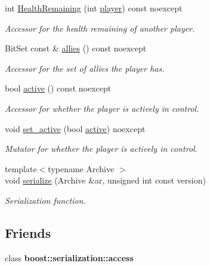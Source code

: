\begin{DoxyCompactItemize}
int \hyperlink{classroundinfo_1_1_round_info_view_a5b7dd1135b438e04017ad0a3bcc4034a}{Health\+Remaining} (int \hyperlink{classroundinfo_1_1_round_info_view_acb1e4edcbe9b01f59ba26542f528ba24}{player}) const noexcept
\begin{DoxyCompactList}\small\item\em Accessor for the health remaining of another player. \end{DoxyCompactList}\item 
Bit\+Set const  \& \hyperlink{classroundinfo_1_1_round_info_view_af00b23d7a3f2fa21fd3cbba1f71e0fd4}{allies} () const noexcept
\begin{DoxyCompactList}\small\item\em Accessor for the set of allies the player has. \end{DoxyCompactList}\item 
bool \hyperlink{classroundinfo_1_1_round_info_view_a1ff1802f7ab8e24008f02bbc0169a160}{active} () const noexcept
\begin{DoxyCompactList}\small\item\em Accessor for whether the player is actively in control. \end{DoxyCompactList}\item 
void \hyperlink{classroundinfo_1_1_round_info_view_a5225bbd75931d1f5235e83d13b726927}{set\+\_\+active} (bool \hyperlink{classroundinfo_1_1_round_info_view_a1ff1802f7ab8e24008f02bbc0169a160}{active}) noexcept
\begin{DoxyCompactList}\small\item\em Mutator for whether the player is actively in control. \end{DoxyCompactList}\item 
{\footnotesize template$<$typename Archive $>$ }\\void \hyperlink{classroundinfo_1_1_round_info_view_a101e6ee624aacfa8dd110aea67e67538}{serialize} (Archive \&ar, unsigned int const version)
\begin{DoxyCompactList}\small\item\em Serialization function. \end{DoxyCompactList}\end{DoxyCompactItemize}
\subsection*{Friends}
\begin{DoxyCompactItemize}
\item 
\mbox{\label{classroundinfo_1_1_round_info_view_ac98d07dd8f7b70e16ccb9a01abf56b9c}} 
class {\bfseries boost\+::serialization\+::access}
\end{DoxyCompactItemize}


